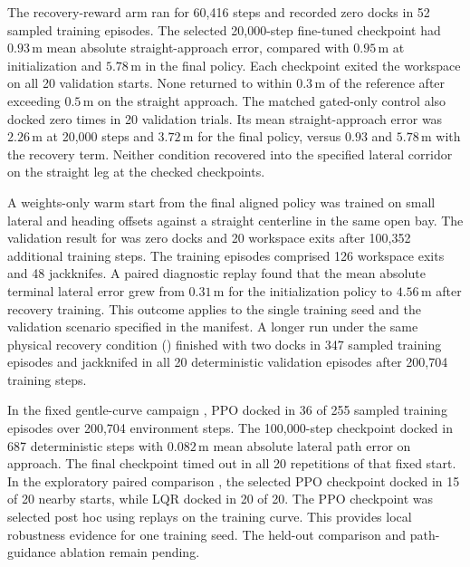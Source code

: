 The recovery-reward arm
 ran for 60,416 steps and
recorded zero docks in 52 sampled training episodes. The selected
20,000-step fine-tuned checkpoint had $0.93\,\mathrm{m}$ mean absolute
straight-approach error, compared with $0.95\,\mathrm{m}$ at initialization
and $5.78\,\mathrm{m}$ in the final policy. Each checkpoint exited the
workspace on all 20 validation starts. None returned to within
$0.3\,\mathrm{m}$ of the reference after exceeding $0.5\,\mathrm{m}$ on
the straight approach. The matched gated-only control
 also docked
zero times in 20 validation trials. Its mean straight-approach error
was $2.26\,\mathrm{m}$ at 20,000 steps and $3.72\,\mathrm{m}$ for the
final policy, versus $0.93$ and $5.78\,\mathrm{m}$ with the recovery
term. Neither condition recovered into the specified lateral corridor
on the straight leg at the checked checkpoints.

A weights-only warm start from the final aligned policy was trained on
small lateral and heading offsets against a straight centerline in the
same open bay. The validation result for
 was zero
docks and 20 workspace exits after 100,352 additional training steps.
The training episodes comprised 126 workspace exits and 48 jackknifes.
A paired diagnostic replay found that the mean absolute terminal lateral
error grew from $0.31\,\mathrm{m}$ for the initialization policy to
$4.56\,\mathrm{m}$ after recovery training. This outcome applies to the
single training seed and the validation scenario specified in the manifest.
A longer run under the same physical recovery condition
() finished with two docks in 347
sampled training episodes and jackknifed in all 20 deterministic validation
episodes after 200,704 training steps.

In the fixed gentle-curve campaign
, PPO docked in 36 of 255 sampled
training episodes over 200,704 environment steps. The 100,000-step
checkpoint docked in 687 deterministic steps with $0.082\,\mathrm{m}$
mean absolute lateral path error on approach. The final checkpoint timed
out in all 20 repetitions of that fixed start. In the exploratory paired
comparison ,
the selected PPO checkpoint docked in 15 of 20 nearby starts, while LQR
docked in 20 of 20. The PPO checkpoint was selected post hoc using replays
on the training curve. This provides local robustness evidence for one
training seed. The held-out comparison and path-guidance ablation remain
pending.

